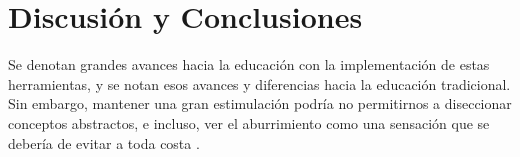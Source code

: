 \section{Discusi\'on y Conclusiones}

Se denotan grandes avances hacia la educaci{\'o}n con la implementaci{\'o}n de estas herramientas, y se notan esos avances y diferencias hacia la educaci\'on tradicional. Sin embargo, mantener una gran estimulaci\'on podr\'ia no permitirnos a diseccionar conceptos abstractos, e incluso, ver el aburrimiento como una sensaci\'on que se deber\'ia de evitar a toda costa \parencite{han2010sociedad}.
